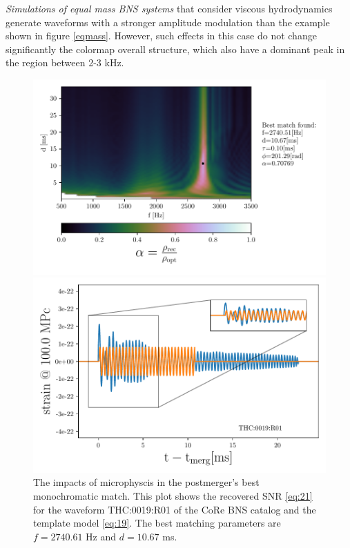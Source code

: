 \FloatBarrier


\textit{Simulations of equal mass BNS systems} that consider viscous hydrodynamics generate waveforms with a stronger amplitude modulation than the example shown in figure \ref{eqmass}. However, such effects in this case do not change significantly the colormap overall structure, which also have a dominant peak in the region between 2-3 kHz.


\begin{figure}[!htbp]
\begin{center}
\begin{minipage}[t]{0.5\linewidth}
\vspace{0pt}
\includegraphics[scale=0.6,trim={2mm 0 35mm 0},clip]{images/Data_analysis/results/2D_grid_11.pdf}
\end{minipage}%
\begin{minipage}[t]{0.5\linewidth}
\vspace{20pt}
\includegraphics[scale=0.45]{images/Data_analysis/results/2D_grid_12.pdf}
\end{minipage}
\captionsetup{width=0.8\textwidth}
\caption[The impacts of microphyscis in the postmerger's best monochromatic match]{The impacts of microphyscis in the postmerger's best monochromatic match. This plot shows the recovered SNR \ref{eq:21} for the waveform THC:0019:R01 of the CoRe BNS catalog \cite{Dietrich:2018phi} and the template model \ref{eq:19}. The best matching parameters are $f=2740.61$ Hz and $d=10.67$ ms.}
\end{center}
\end{figure}

